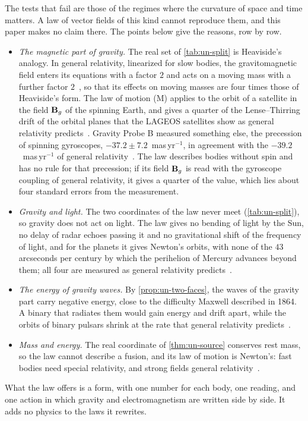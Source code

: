 The tests that fail are those of the regimes where the curvature of space and time matters. A law of vector fields of this kind cannot reproduce them, and this paper makes no claim there. The points below give the reasons, row by row.
\begin{itemize}[leftmargin=1.4em]
  \item \emph{The magnetic part of gravity.} The real set of \cref{tab:un-split} is Heaviside's analogy. In general relativity, linearized for slow bodies, the gravitomagnetic field enters its equations with a factor $2$ and acts on a moving mass with a further factor $2$~\citep{Mashhoon2003}, so that its effects on moving masses are four times those of Heaviside's form. The law of motion (M) applies to the orbit of a satellite in the field $\mathbf{B}_g$ of the spinning Earth, and gives a quarter of the Lense--Thirring drift of the orbital planes that the LAGEOS satellites show as general relativity predicts~\citep{Ciufolini2004}. Gravity Probe B measured something else, the precession of spinning gyroscopes, $-37.2 \pm 7.2$~mas\,yr$^{-1}$, in agreement with the $-39.2$~mas\,yr$^{-1}$ of general relativity~\citep{Everitt2011}. The law describes bodies without spin and has no rule for that precession; if its field $\mathbf{B}_g$ is read with the gyroscope coupling of general relativity, it gives a quarter of the value, which lies about four standard errors from the measurement.
  \item \emph{Gravity and light.} The two coordinates of the law never meet (\cref{tab:un-split}), so gravity does not act on light. The law gives no bending of light by the Sun, no delay of radar echoes passing it and no gravitational shift of the frequency of light, and for the planets it gives Newton's orbits, with none of the $43$ arcseconds per century by which the perihelion of Mercury advances beyond them; all four are measured as general relativity predicts~\citep{Will2014}.
  \item \emph{The energy of gravity waves.} By \cref{prop:un-two-faces}, the waves of the gravity part carry negative energy, close to the difficulty Maxwell described in 1864.
 A binary that radiates them would gain energy and drift apart, while the orbits of binary pulsars shrink at the rate that general relativity predicts~\citep{WeisbergHuang2016}.
  \item \emph{Mass and energy.} The real coordinate of \cref{thm:un-source} conserves rest mass, so the law cannot describe a fusion, and its law of motion is Newton's: fast bodies need special relativity, and strong fields general relativity~\citep{Einstein1916}.
\end{itemize}
What the law offers is a form, with one number for each body, one reading, and one action in which gravity and electromagnetism are written side by side. It adds no physics to the laws it rewrites.
